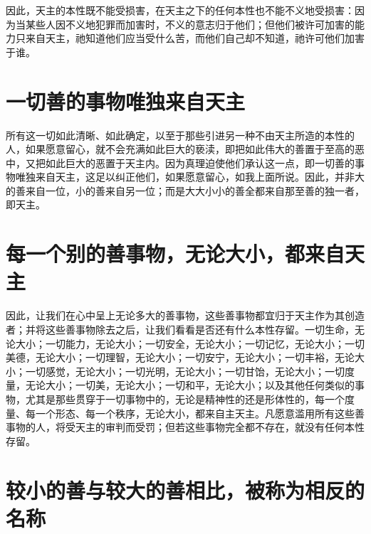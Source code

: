 因此，天主的本性既不能受损害，在天主之下的任何本性也不能不义地受损害：因为当某些人因不义地犯罪而加害时，不义的意志归于他们；但他们被许可加害的能力只来自天主，祂知道他们应当受什么苦，而他们自己却不知道，祂许可他们加害于谁。\par


\section{一切善的事物唯独来自天主}

所有这一切如此清晰、如此确定，以至于那些引进另一种不由天主所造的本性的人，如果愿意留心，就不会充满如此巨大的亵渎，即把如此伟大的善置于至高的恶中，又把如此巨大的恶置于天主内。因为真理迫使他们承认这一点，即一切善的事物唯独来自天主，这足以纠正他们，如果愿意留心，如我上面所说。因此，并非大的善来自一位，小的善来自另一位；而是大大小小的善全都来自那至善的独一者，即天主。\par


\section{每一个别的善事物，无论大小，都来自天主}

因此，让我们在心中呈上无论多大的善事物，这些善事物都宜归于天主作为其创造者；并将这些善事物除去之后，让我们看看是否还有什么本性存留。一切生命，无论大小；一切能力，无论大小；一切安全，无论大小；一切记忆，无论大小；一切美德，无论大小；一切理智，无论大小；一切安宁，无论大小；一切丰裕，无论大小；一切感觉，无论大小；一切光明，无论大小；一切甘饴，无论大小；一切度量，无论大小；一切美，无论大小；一切和平，无论大小；以及其他任何类似的事物，尤其是那些贯穿于一切事物中的，无论是精神性的还是形体性的，每一个度量、每一个形态、每一个秩序，无论大小，都来自主天主。凡愿意滥用所有这些善事物的人，将受天主的审判而受罚；但若这些事物完全都不存在，就没有任何本性存留。\par


\section{较小的善与较大的善相比，被称为相反的名称}

